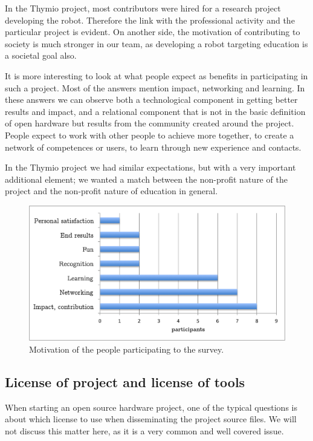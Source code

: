 \documentclass[letterpaper, 10 pt, conference]{ieeeconf}  %
\begin{document}
In the Thymio project, most contributors were hired for a research project developing the robot. 
Therefore the link with the professional activity and the particular project is evident.
On another side, the motivation of contributing to society is much stronger in our team, as developing a robot targeting education is a societal goal also.

It is more interesting to look at what people expect as benefits in participating in such a project.
Most of the answers mention impact, networking and learning. 
In these answers we can observe both a technological component in getting better results and impact, and a relational component that is not in the basic definition of open hardware but results from the community created around the project. 
People expect to work with other people to achieve more together, to create a network of competences or users, to learn through new experience and contacts. 

In the Thymio project we had similar expectations, but with a very important additional element; we wanted a match between the non-profit nature of the project and the non-profit nature of education in general. 

\begin{figure}
\centering
\includegraphics[width=.7\columnwidth]{figures/getout}
\caption{Motivation of the people participating to the survey.}
\label{fig:getout}
\end{figure}

\subsection{License of project and license of tools}

When starting an open source hardware project, one of the typical questions is about which license to use when disseminating the project source files. 
We will not discuss this matter here, as it is a very common and well covered issue. 
\end{document}
